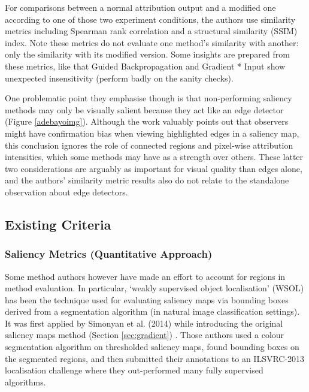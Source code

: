 \documentclass[main]{subfiles}
\begin{document}
For comparisons between a normal attribution output and a modified one according to one of those two experiment conditions, the authors use similarity metrics including Spearman rank correlation and a structural similarity (SSIM) index. Note these metrics do not evaluate one method's similarity with another: only the similarity with its modified version. Some insights are prepared from these metrics, like that Guided Backpropagation and Gradient * Input show unexpected insensitivity (perform badly on the sanity checks). 


One problematic point they emphasise though is that non-performing saliency methods may only be visually salient because they act like an edge detector (Figure \ref{adebayoimg}). Although the work valuably points out that observers might have confirmation bias when viewing highlighted edges in a saliency map, this conclusion ignores the role of connected regions and pixel-wise attribution intensities, which some methods may have as a strength over others. These latter two considerations are arguably as important for visual quality than edges alone, and the authors' similarity metric results also do not relate to the standalone observation about edge detectors.




\subsection{Existing Criteria} \label{sec:existing_criteria}

\subsubsection{Saliency Metrics (Quantitative Approach)}

Some method authors however have made an effort to account for regions in method evaluation. In particular, `weakly supervised object localisation' (WSOL) has been the technique used for evaluating saliency maps via bounding boxes derived from a segmentation algorithm (in natural image classification settings). It was first applied by Simonyan et al. (2014) while introducing the original saliency maps method (Section \ref{sec:gradient}) \cite{saliencyII} . Those authors used a colour segmentation algorithm on thresholded saliency maps, found bounding boxes on the segmented regions, and then submitted their annotations to an ILSVRC-2013 localisation challenge where they out-performed many fully supervised algorithms. 
\end{document}
